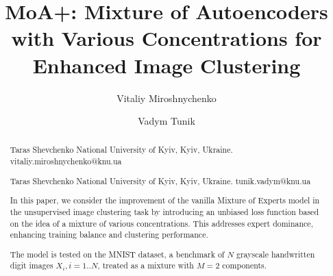\documentclass[ascii]{abook}
\begin{document}


\begin{abstract}



\title{MoA+: Mixture of Autoencoders with Various Concentrations for Enhanced Image Clustering}




\author[V. ~Miroshnychenko]{Vitaliy Miroshnychenko}
{Taras Shevchenko National University of Kyiv, Kyiv, Ukraine.}
{vitaliy.miroshnychenko@knu.ua}
\author[V.~Tunik]{Vadym Tunik}
{Taras Shevchenko National University of Kyiv, Kyiv, Ukraine.}
{tunik.vadym@knu.ua}

\maketitle


In this paper, we consider the improvement of the vanilla Mixture of Experts model \cite{hinton1991} in the unsupervised image clustering task by introducing an unbiased loss function based on the idea of a mixture of various concentrations. This addresses expert dominance, enhancing training balance and clustering performance. 

The model is tested on the MNIST dataset, a benchmark of $N$ grayscale handwritten digit images $X_i, i=1..N$, treated as a mixture with $M = 2$ components.


\end{abstract}
\end{document}
